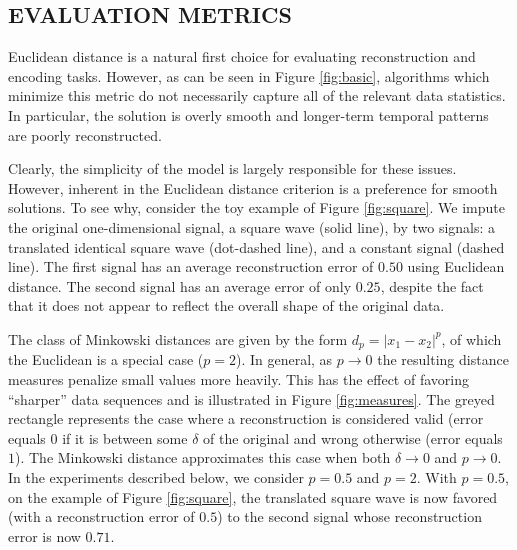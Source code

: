 \documentclass{article}
\newcommand{\FIXME}[2][FIXME]{\textcolor{blue}{\textbf{#1}: \emph{#2}}}
\begin{document}
\subsection{EVALUATION METRICS}
\label{ssec:measures}
Euclidean distance is a natural first choice for evaluating
reconstruction and encoding tasks. However, as can be seen in Figure
\ref{fig:basic}, algorithms which minimize this metric do not
necessarily capture all of the relevant data statistics.  In
particular, the solution is overly smooth and longer-term temporal
patterns are poorly reconstructed.

Clearly, the simplicity of the model is largely responsible for these
issues.  However, inherent in the Euclidean distance criterion is a
preference for smooth solutions.
To see why, consider the toy example of Figure \ref{fig:square}. We
impute the original one-dimensional signal, a square wave (solid
line), by two signals: a translated identical square wave (dot-dashed
line), and a constant signal (dashed line). The first signal has an
average reconstruction error of $0.50$ using Euclidean distance. The
second signal has an average error of only $0.25$, despite the fact
that it does not appear to reflect the overall shape of the original
data.


The class of Minkowski distances are given by the form $d_p =
|x_1-x_2|^p$, of which the Euclidean is a special case ($p=2$).  In
general, as $p \rightarrow 0$ the resulting distance measures penalize
small values more heavily.  This has the effect of favoring
``sharper'' data sequences and is illustrated in Figure
\ref{fig:measures}.  The greyed rectangle represents the case where a
reconstruction is considered valid (error equals $0$ if it is between
some $\delta$ of the original and wrong otherwise (error equals $1$).
The Minkowski distance approximates this case when both
$\delta \rightarrow 0$ and $p \rightarrow 0$.  In the experiments described
below, we consider $p=0.5$ and $p=2$.  With $p=0.5$, on the example of
Figure \ref{fig:square}, the translated square wave is now favored
(with a reconstruction error of $0.5$) to the second signal whose
reconstruction error is now $0.71$.
\end{document}
